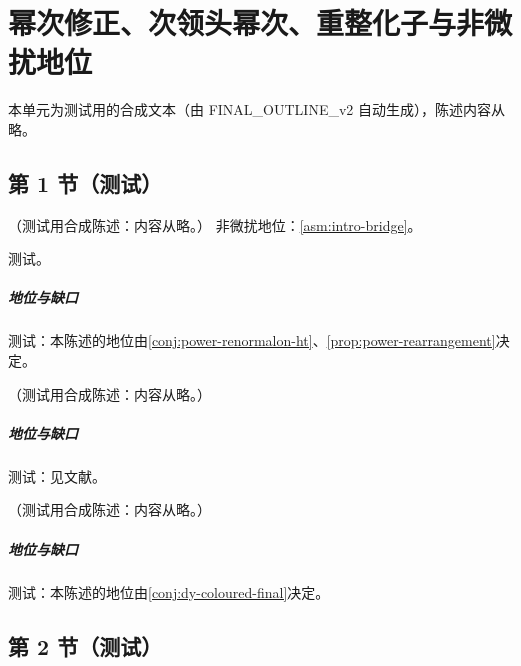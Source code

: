 \chapter{幂次修正、次领头幂次、重整化子与非微扰地位}\label{ch:power}
本单元为测试用的合成文本（由 FINAL\_OUTLINE\_v2 自动生成），陈述内容从略。

\section{第 1 节（测试）}\label{sec:power-twist4}

\begin{proposition}\label{prop:power-dis-twist4-x}
（测试用合成陈述：内容从略。）
非微扰地位：\cref{asm:intro-bridge}。
\end{proposition}
\begin{proofsketch}测试。\end{proofsketch}
\paragraph{地位与缺口}测试：本陈述的地位由\cref{conj:power-renormalon-ht}、\cref{prop:power-rearrangement}决定。

\begin{proposition}\label{prop:power-twist3-sidis}
（测试用合成陈述：内容从略。）
\end{proposition}
\paragraph{地位与缺口}测试：见文献。

\begin{conjecture}\label{conj:power-twist3-pp}
（测试用合成陈述：内容从略。）
\end{conjecture}
\paragraph{地位与缺口}测试：本陈述的地位由\cref{conj:dy-coloured-final}决定。

\section{第 2 节（测试）}\label{sec:power-twist3}

